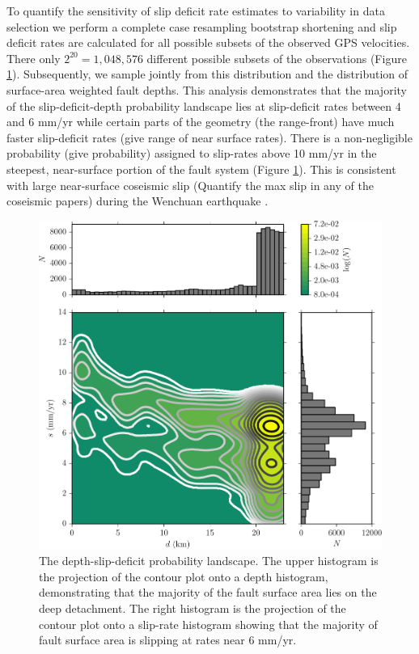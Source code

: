 \documentclass[12pt]{article}
\begin{document}
To quantify the sensitivity of slip deficit rate estimates to variability in data selection  we perform a complete case resampling bootstrap shortening and slip deficit rates are calculated for all possible subsets of the observed GPS velocities. There only $2^{20} = 1,048,576$ different possible subsets of the observations (Figure \ref{fig:distribution}). Subsequently, we sample jointly from this distribution and the distribution of surface-area weighted fault depths. This analysis demonstrates that the majority of the slip-deficit-depth probability landscape lies at slip-deficit rates between 4 and 6 mm/yr while certain parts of the geometry (the range-front) have much faster slip-deficit rates (give range of near surface rates). There is a non-negligible probability (give probability) assigned to slip-rates above 10 mm/yr in the steepest, near-surface portion of the fault system (Figure \ref{fig:distribution}). This is consistent with large near-surface coseismic slip (Quantify the max slip in any of the coseismic papers) during the Wenchuan earthquake \citep{Shen2009}. 

\begin{figure}[h!]
    \centering
    \includegraphics{figs/depth_slip_contour.pdf}
    \caption{The depth-slip-deficit probability landscape. The upper histogram is the projection of the contour plot onto a depth histogram, demonstrating that the majority of the fault surface area lies on the deep detachment. The right histogram is the projection of the contour plot onto a slip-rate histogram showing that the majority of fault surface area is slipping at rates near 6 mm/yr.}
    \label{fig:distribution}
\end{figure}
\end{document}
